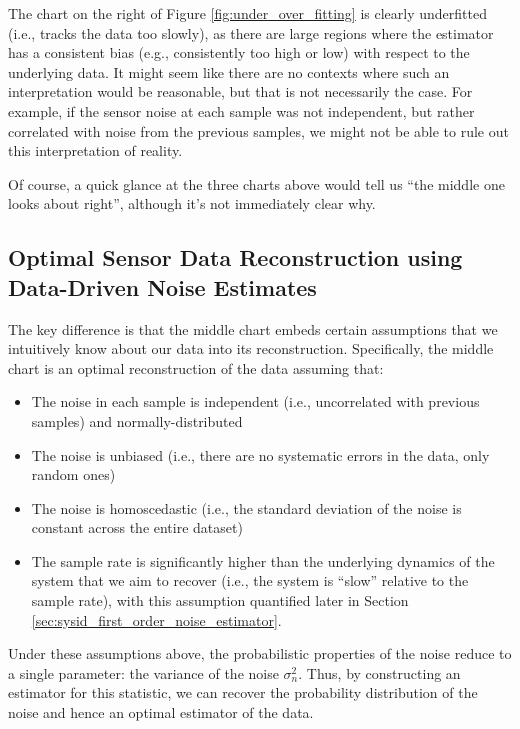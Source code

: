 The chart on the right of Figure \ref{fig:under_over_fitting} is clearly underfitted (i.e., tracks the data too slowly), as there are large regions where the estimator has a consistent bias (e.g., consistently too high or low) with respect to the underlying data. It might seem like there are no contexts where such an interpretation would be reasonable, but that is not necessarily the case. For example, if the sensor noise at each sample was not independent, but rather correlated with noise from the previous samples, we might not be able to rule out this interpretation of reality.

Of course, a quick glance at the three charts above would tell us ``the middle one looks about right'', although it's not immediately clear why.

\subsection{Optimal Sensor Data Reconstruction using Data-Driven Noise Estimates}
\label{subsec:optimal_sensor_data_reconstruction}

The key difference is that the middle chart embeds certain assumptions that we intuitively know about our data into its reconstruction. Specifically, the middle chart is an optimal reconstruction of the data assuming that:

\begin{itemize}
    \item The noise in each sample is independent (i.e., uncorrelated with previous samples) and normally-distributed
    \item The noise is unbiased (i.e., there are no systematic errors in the data, only random ones)
    \item The noise is homoscedastic (i.e., the standard deviation of the noise is constant across the entire dataset)
    \item The sample rate is significantly higher than the underlying dynamics of the system that we aim to recover (i.e., the system is ``slow'' relative to the sample rate), with this assumption quantified later in Section \ref{sec:sysid_first_order_noise_estimator}.
\end{itemize}

Under these assumptions above, the probabilistic properties of the noise reduce to a single parameter: the variance of the noise $\sigma^2_n$. Thus, by constructing an estimator for this statistic, we can recover the probability distribution of the noise and hence an optimal estimator of the data.

